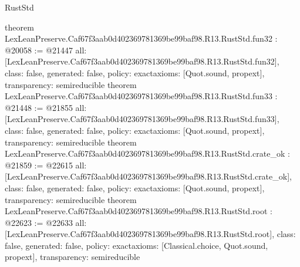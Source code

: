 \begin{lexlean}{RustStd}
\begin{coremodule}
{}
theorem LexLeanPreserve.Caf67f3aab0d402369781369be99baf98.R13.RustStd.fun32 : @20058 := @21447 {
  all: [LexLeanPreserve.Caf67f3aab0d402369781369be99baf98.R13.RustStd.fun32],
  class: false,
  generated: false,
  policy: exact{axioms: [Quot.sound, propext]},
  transparency: semireducible
}
theorem LexLeanPreserve.Caf67f3aab0d402369781369be99baf98.R13.RustStd.fun33 : @21448 := @21855 {
  all: [LexLeanPreserve.Caf67f3aab0d402369781369be99baf98.R13.RustStd.fun33],
  class: false,
  generated: false,
  policy: exact{axioms: [Quot.sound, propext]},
  transparency: semireducible
}
theorem LexLeanPreserve.Caf67f3aab0d402369781369be99baf98.R13.RustStd.crate_ok : @21859 := @22615 {
  all: [LexLeanPreserve.Caf67f3aab0d402369781369be99baf98.R13.RustStd.crate_ok],
  class: false,
  generated: false,
  policy: exact{axioms: [Quot.sound, propext]},
  transparency: semireducible
}
theorem LexLeanPreserve.Caf67f3aab0d402369781369be99baf98.R13.RustStd.root : @22623 := @22633 {
  all: [LexLeanPreserve.Caf67f3aab0d402369781369be99baf98.R13.RustStd.root],
  class: false,
  generated: false,
  policy: exact{axioms: [Classical.choice, Quot.sound, propext]},
  transparency: semireducible
}


\end{coremodule}
\end{lexlean}
